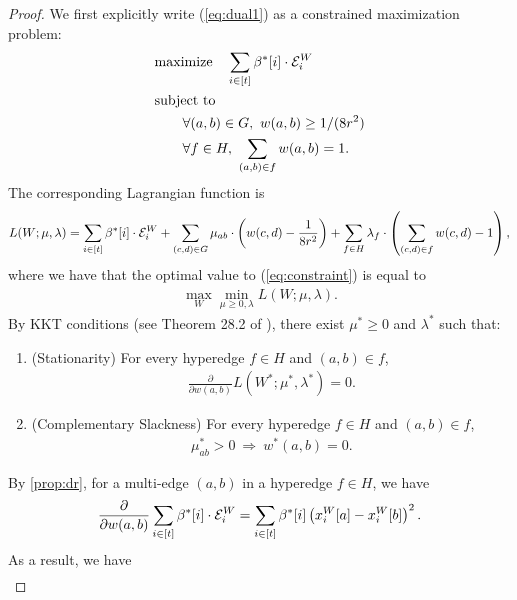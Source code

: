 \documentclass{article}
\begin{document}
\begin{proof}
    We first explicitly write (\ref{eq:dual1}) as a constrained maximization problem:
    \begin{align}
        &\mathrm{maximize}\quad
        \sum_{i\in[t]} \beta^*[i] \cdot \mathcal{E}_i^{W} \notag \\
        & \mathrm{subject\ to} \notag \\
        & \qquad \forall (a,b)\in G,\ w(a,b) \geq 1/(8r^2) \notag \\
        & \qquad \forall f\in H,\ \sum_{(a,b)\in f} w(a,b) = 1.
        \label{eq:constraint}
    \end{align}
    The corresponding Lagrangian function is
    \begin{align}
        L(W; \mu,\lambda)=
        \sum_{i\in[t]} \beta^*[i] \cdot \mathcal{E}_i^{W} +
        \sum_{(c,d)\in G} \mu_{ab} \cdot \left( w(c,d) - \frac{1}{8r^2}\right) +
        \sum_{f\in H}\lambda_f\cdot \left(\sum_{(c,d)\in f} w(c,d) - 1\right),
    \end{align}
    where we have that the optimal value to (\ref{eq:constraint}) is equal to
    \begin{align*}
        \max_{W} \min_{\mu \geq 0, \lambda} L(W; \mu,\lambda).
    \end{align*}
    By KKT conditions (see Theorem 28.2 of \cite{Rockafellar70}), there exist $\mu^*\geq 0$ and $\lambda^*$ such that:
    \begin{enumerate}
        \item (Stationarity) For every hyperedge $f\in H$ and $(a,b)\in f$,
        \begin{align*}
            \frac{\partial}{\partial w(a,b)} L(W^*;\mu^*,\lambda^*) = 0.
        \end{align*}
        \item (Complementary Slackness) For every hyperedge $f\in H$ and $(a,b)\in f$,
        \begin{align*}
            \mu^*_{ab} > 0\ \Rightarrow\ w^*(a,b) = 0.
        \end{align*}
    \end{enumerate}
    By \cref{prop:dr},
    for a multi-edge $(a,b)$ in a hyperedge $f\in H$,
    we have
    \begin{align*}
        \frac{\partial}{\partial w(a,b)} \sum_{i\in[t]} \beta^*[i] \cdot \mathcal{E}_i^{W} =
        \sum_{i\in [t]} \beta^*[i] \left(x_i^{W}[a] - x_i^W[b]\right)^2.
    \end{align*}
    As a result, we have
    \begin{align*}

\end{align*}
\end{proof}
\end{document}
